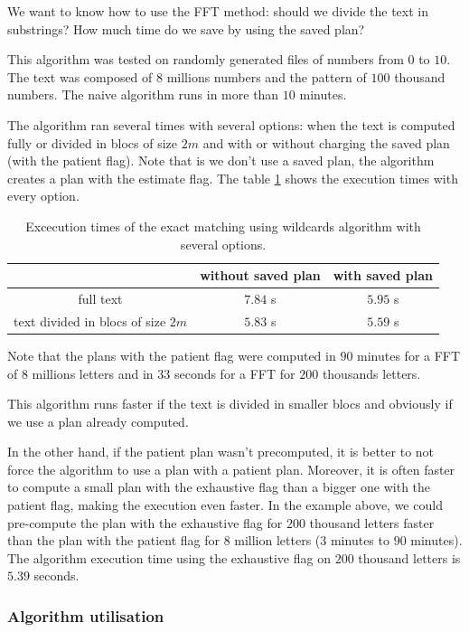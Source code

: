 \documentclass[preprint,12pt]{elsarticle}
\begin{document}
We want to know how to use the FFT method:
should we divide the text in substrings?
How much time do we save by using the saved plan?

This algorithm was tested on randomly generated files of numbers from $0$ to $10$.
The text was composed of $8$ millions numbers and the pattern of $100$ thousand numbers.
The naive algorithm runs in more than $10$ minutes.

The algorithm ran several times with several options:
when the text is computed fully or divided in blocs of size $2m$
and with or without charging the saved plan (with the patient flag).
Note that is we don't use a saved plan, the algorithm creates a plan with the estimate flag.
The table \ref{TableWC} shows the execution times with every option.

\begin{table}[h]
\begin{tabular}{|c|c|c|}
\hline
			& without saved plan & with saved plan \\ \hline
full text	& $7.84$ s & $5.95$ s \\ \hline
text divided in blocs of size $2m$ &  $5.83$ s & $5.59$ s \\ \hline
\end{tabular}
\caption{Excecution times of the exact matching using wildcards algorithm with several options.}
\label{TableWC}
\end{table}


Note that the plans with the patient flag were computed in
$90$ minutes for a FFT of $8$ millions letters
and in $33$ seconds for a FFT for $200$ thousands letters.

This algorithm runs faster if the text is divided in smaller blocs
and obviously if we use a plan already computed.

In the other hand, if the patient plan wasn't precomputed,
it is better to not force the algorithm to use a plan with a patient plan.
Moreover, it is often faster to compute a small plan with the exhaustive flag
than a bigger one with the patient flag, making the execution even faster.
In the example above, we could pre-compute the plan
with the exhaustive flag for $200$ thousand letters faster than
the plan with the patient flag for $8$ million letters ($3$ minutes to $90$ minutes).
The algorithm execution time using the exhaustive flag on $200$ thousand letters is $5.39$ seconds.

\subsubsection*{Algorithm utilisation}
\end{document}
